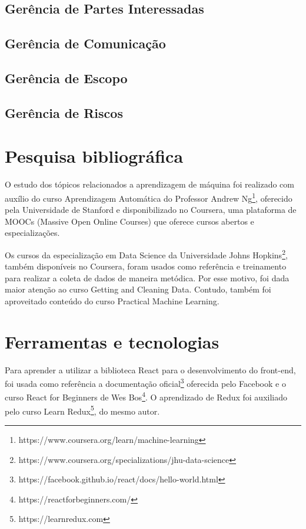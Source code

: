 \subsection{Gerência de Partes Interessadas}
\subsection{Gerência de Comunicação}
\subsection{Gerência de Escopo}
\subsection{Gerência de Riscos}

\section{Pesquisa bibliográfica}
O estudo dos tópicos relacionados a aprendizagem de máquina foi realizado com auxílio do curso Aprendizagem Automática do Professor Andrew Ng\footnote{ https://www.coursera.org/learn/machine-learning}, oferecido pela Universidade de Stanford e disponibilizado no Coursera, uma plataforma de MOOCs (Massive Open Online Courses) que oferece cursos abertos e especializações.

Os cursos da especialização em Data Science da Universidade Johns Hopkins\footnote{ https://www.coursera.org/specializations/jhu-data-science}, também disponíveis no Coursera, foram usados como referência e treinamento para realizar a coleta de dados de maneira metódica. Por esse motivo, foi dada maior atenção ao curso Getting and Cleaning Data. Contudo, também foi aproveitado conteúdo do curso Practical Machine Learning.

\section{Ferramentas e tecnologias}
Para aprender a utilizar a biblioteca React para o desenvolvimento do front-end, foi usada como referência a documentação oficial\footnote{https://facebook.github.io/react/docs/hello-world.html} oferecida pelo Facebook e o curso React for Beginners de Wes Bos\footnote{ https://reactforbeginners.com/}. O aprendizado de Redux foi auxiliado pelo curso Learn Redux\footnote{https://learnredux.com}, do mesmo autor.
